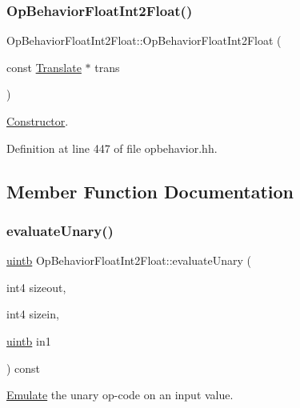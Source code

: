 \subsubsection{\texorpdfstring{OpBehaviorFloatInt2Float()}{OpBehaviorFloatInt2Float()}}
{\footnotesize\ttfamily Op\+Behavior\+Float\+Int2\+Float\+::\+Op\+Behavior\+Float\+Int2\+Float (\begin{DoxyParamCaption}\item[{const \mbox{\hyperlink{class_translate}{Translate}} $\ast$}]{trans }\end{DoxyParamCaption})\hspace{0.3cm}{\ttfamily [inline]}}



\mbox{\hyperlink{class_constructor}{Constructor}}. 



Definition at line 447 of file opbehavior.\+hh.



\subsection{Member Function Documentation}
\mbox{\label{class_op_behavior_float_int2_float_a4e2f03cacc50b6a221a646d4d9378d57}} 
\subsubsection{\texorpdfstring{evaluateUnary()}{evaluateUnary()}}
{\footnotesize\ttfamily \mbox{\hyperlink{types_8h_a2db313c5d32a12b01d26ac9b3bca178f}{uintb}} Op\+Behavior\+Float\+Int2\+Float\+::evaluate\+Unary (\begin{DoxyParamCaption}\item[{int4}]{sizeout,  }\item[{int4}]{sizein,  }\item[{\mbox{\hyperlink{types_8h_a2db313c5d32a12b01d26ac9b3bca178f}{uintb}}}]{in1 }\end{DoxyParamCaption}) const\hspace{0.3cm}{\ttfamily [virtual]}}



\mbox{\hyperlink{class_emulate}{Emulate}} the unary op-\/code on an input value. 


